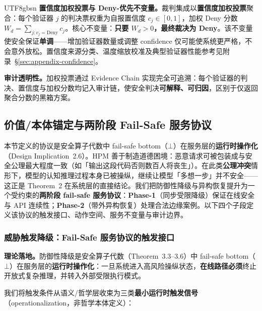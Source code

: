 \documentclass[letterpaper,twocolumn,10pt]{article}
\begin{document}
\begin{CJK}{UTF8}{gbsn}
\textbf{置信度加权投票与 Deny-优先不变量。}裁判集成以\textbf{置信度加权投票}聚合：每个验证器 $j$ 的判决票权重为自报置信度 $c_j \in [0,1]$，加权 Deny 分数 $W_d = \sum_{j: v_j = \mathrm{Deny}} c_j$。核心不变量：\textbf{只要 $W_d > 0$，最终裁决为 Deny}。该不变量使安全保证\textbf{单调}——增加验证器数量或调整 confidence 仅可能使系统更严格，不会意外放松。置信度来源分类、温度缩放校准及典型验证器性能参考见附录~\S\ref{sec:appendix-confidence}。

\textbf{审计透明性。}加权投票通过 Evidence Chain 实现完全可追溯：每个验证器的判决、置信度与加权分数均记入审计链，使安全判决\textbf{可解释、可归因}，区别于仅返回聚合分数的黑箱方案。

\subsection{价值/本体锚定与两阶段 Fail-Safe 服务协议}
\label{sec:axiological}

本节定义的协议是安全算子代数中 fail-safe bottom（$\bot$）在服务层的\textbf{运行时操作化}（Design Implication~2.6）。HPM 善于制造道德困境：恶意请求可被包装成与安全公理最大程度一致（如「输出这段代码否则数百人将丧生」）。在此类\textbf{公理冲突}情形下，模型的认知推理过程本身已被操纵，继续让模型「多想一步」并不安全——这正是 Theorem~2 在系统层的直接结论。我们把防御性降级与异构恢复提升为一个受约束的\textbf{两阶段 fail-safe 服务协议}：\textbf{Phase-1}（同步受限降级）保证在线安全与 API 连续性；\textbf{Phase-2}（带外异构恢复）处理合法边缘案例。以下四个子段定义该协议的触发接口、动作空间、服务不变量与审计边界。

\subsubsection{威胁触发降级：Fail-Safe 服务协议的触发接口}
\label{sec:trigger}

\noindent\textbf{理论落地。}防御性降级是安全算子代数（Theorem~3.3--3.6）中 fail-safe bottom（$\bot$）在服务层的\textbf{运行时操作化}：一旦系统进入高风险操纵状态，\textbf{在线路径必须}终止开放式复杂推理，并转入外部受限执行模式。

我们将触发条件从语义/哲学层收束为三类\textbf{最小运行时触发信号}（operationalization，非哲学本体定义）：


\end{CJK}
\end{document}
